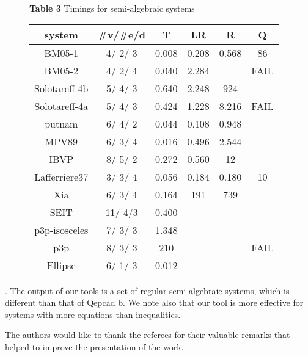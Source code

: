 \documentclass{sig-alternate}
\begin{document}
\begin{figure}
\centering
{\textbf{Table 3} Timings for semi-algebraic systems}
\medskip
\newline
{\small
\begin{tabular}{c|c|c|c|c|c}
\hline
system        &\#v/\#e/d&    T    & LR      & R    & Q\\\hline
BM05-1        &4/ 2/ 3  & 0.008   & 0.208  & 0.568   &86\\
BM05-2        &4/ 2/ 4  & 0.040   & 2.284  &  &FAIL\\
Solotareff-4b &5/ 4/ 3  & 0.640   & 2.248  &924      &\\
Solotareff-4a &5/ 4/ 3  & 0.424   & 1.228  &8.216    &FAIL\\
putnam        &6/ 4/ 2  & 0.044   & 0.108  &0.948    &\\
MPV89         &6/ 3/ 4  & 0.016   & 0.496  & 2.544   &\\
IBVP          &8/ 5/ 2  & 0.272   & 0.560  &12   &\\
Lafferriere37 &3/ 3/ 4  & 0.056   & 0.184  &0.180    &10\\
Xia           &6/ 3/ 4  & 0.164   & 191    & 739     &\\
SEIT          &11/ 4/3  & 0.400   & &  &\\
p3p-isosceles &7/ 3/ 3  & 1.348   & &  &\\
p3p           &8/ 3/ 3  & 210     & &  &FAIL\\
Ellipse       &6/ 1/ 3  & 0.012   & &  &\\
\hline
\end{tabular}
}
\end{figure}


\smallskip{}. 
The output of our tools 
is a set of regular semi-algebraic systems,
which is different than that of {\sc Qepcad b}.
We note also that our tool is more effective for
systems with more equations than inequalities.



\bigskip{}
The authors would like to thank the referees for their valuable
remarks that helped to improve the presentation of the work.

\newpage
\end{document}
